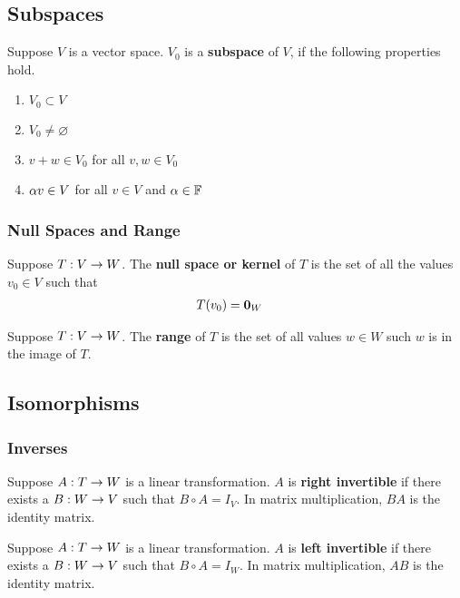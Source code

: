 \subsection{Subspaces}
\begin{definition}
    Suppose $V$ is a vector space. $V_0$ is a \textbf{subspace} of $V$, if the following properties hold.
    \begin{enumerate}
        \item $V_0 \subset V$
        \item $V_0 \neq \varnothing$
        \item $v + w \in V_0$ for all $v,w \in V_0$
        \item $\alpha v \in V$ for all $v \in V$ and $\alpha \in \mathbb{F}$
    \end{enumerate}
\end{definition}

\subsubsection{Null Spaces and Range}
\begin{definition}
    Suppose $T : V \rightarrow W$. The \textbf{null space or kernel} of $T$ is the set of all the values $v_0 \in V$ such that
    \begin{align*}
        T(v_0) &= \mathbf{0}_W
    \end{align*}
\end{definition}

\begin{definition}
    Suppose $T : V \rightarrow W$. The \textbf{range} of $T$ is the set of all values $w \in W$ such $w$ is in the image of $T$.
\end{definition}

\subsection{Isomorphisms}
\subsubsection{Inverses}
\begin{definition}
    Suppose $A : T \rightarrow W$ is a linear transformation. $A$ is \textbf{right invertible} if there exists a $B : W \rightarrow V$ such that $B \circ A = I_V$.
    In matrix multiplication, $BA$ is the identity matrix.
\end{definition}

\begin{definition}
    Suppose $A : T \rightarrow W$ is a linear transformation. $A$ is \textbf{left invertible} if there exists a $B : W \rightarrow V$ such that $B \circ A = I_W$.
    In matrix multiplication, $AB$ is the identity matrix.
\end{definition}

